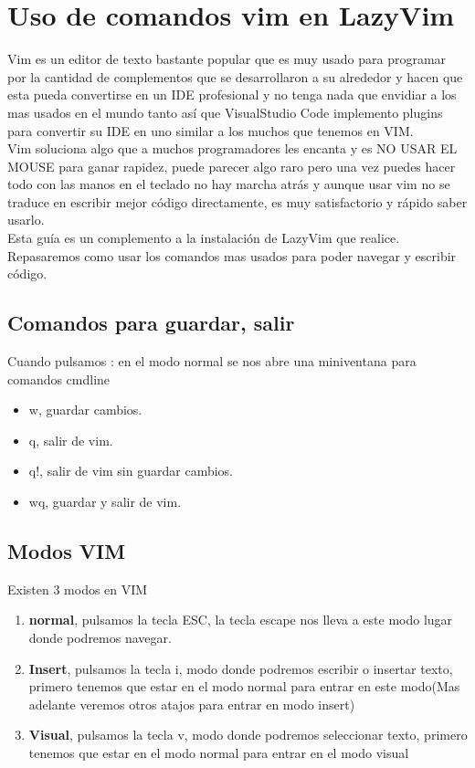 \chapter{Uso de comandos vim en LazyVim}
Vim es un editor de texto bastante popular que es muy usado para programar por la cantidad de complementos que se desarrollaron a su alrededor y hacen que esta pueda convertirse en un IDE profesional y no tenga nada que envidiar a los mas usados en el mundo tanto así que VisualStudio Code implemento plugins para convertir su IDE en uno similar a los muchos que tenemos en VIM.
\\
Vim soluciona algo que a muchos programadores les encanta y es NO USAR EL MOUSE para ganar rapidez, puede parecer algo raro pero una vez puedes hacer todo con las manos en el teclado no hay marcha atrás y aunque usar vim no se traduce en escribir mejor código directamente, es muy satisfactorio y rápido saber usarlo.
\\
Esta guía es un complemento a la instalación de LazyVim que realice. Repasaremos como usar los comandos mas usados para poder navegar y escribir código.
\section{Comandos para guardar, salir}
Cuando pulsamos : en el modo normal se nos abre una miniventana para comandos cmdline
\begin{itemize}
  \item w, guardar cambios.
  \item q, salir de vim.
  \item q!, salir de vim sin guardar cambios.
  \item wq, guardar y salir de vim.
\end{itemize}
\section{Modos VIM}
Existen 3 modos en VIM
\begin{enumerate}
  \item \textbf{normal}, pulsamos la tecla ESC, la tecla escape nos lleva a este modo lugar donde podremos navegar.
  \item \textbf{Insert}, pulsamos la tecla i, modo donde podremos escribir o insertar texto, primero tenemos que estar en el modo normal para entrar en este modo(Mas adelante veremos otros atajos para entrar en modo insert)
  \item \textbf{Visual}, pulsamos la tecla v, modo donde podremos seleccionar texto, primero tenemos que estar en el modo normal para entrar en el modo visual
\end{enumerate}
